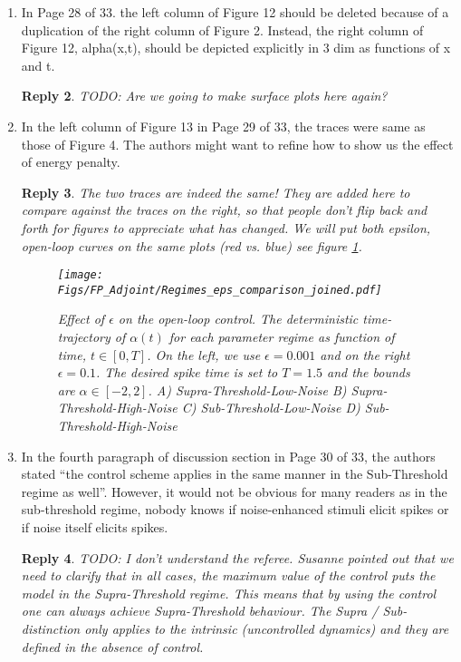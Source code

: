 \documentclass{article}
\newtheorem*{rep}{Reply}
\begin{document}
\begin{enumerate}
\begin{rep}
WE have added the following two sentences to the draft:
TODO:

\end{rep}
\item In Page 28 of 33. the left column of Figure 12 should be deleted because
of a duplication of the right column of Figure 2. Instead, the right column of Figure
12, alpha(x,t), should be depicted explicitly in 3 dim as functions of x and t.
\begin{rep}
TODO:
Are we going to make surface plots here again?
\end{rep}

\item In the left column of Figure 13 in Page 29 of 33, the traces were same as
those of Figure 4. The authors might want to refine how to show us the effect of
energy penalty.
\begin{rep}
The two traces are indeed the same! They are added here to compare against
the traces on the right, so that people don't flip back and forth for figures to
appreciate what has changed.
We will put both epsilon, open-loop curves on the same plots (red vs.
blue) see figure \ref{fig:epsilong_comparison_same_graph}.
\def \T {{ T}}
\begin{figure}[htp]
\begin{center}
  \texttt{[image: Figs/FP\_Adjoint/Regimes\_eps\_comparison\_joined.pdf]}
  \caption[labelInTOC]{Effect of $\epsilon$ on the open-loop control.
  The deterministic time-trajectory of $\alpha(t)$ for each
  parameter regime as function of time, $t \in [0, \T]$.
  On the left, we use $\epsilon = 0.001$ and on the right $\epsilon =0.1$.
  The desired spike time is set to $\T=1.5$ and the bounds are $\alpha \in
  [-2,2]$. A)
   Supra-Threshold-Low-Noise
    B) 
   Supra-Threshold-High-Noise
    C)
   Sub-Threshold-Low-Noise 
    D)
   Sub-Threshold-High-Noise}
  \label{fig:epsilong_comparison_same_graph}
\end{center}
\end{figure}

\end{rep}

\item In the fourth paragraph of discussion section in Page 30 of 33, the
authors stated “the control scheme applies in the same manner in the Sub-Threshold
regime as well”. However, it would not be obvious for many readers as in the
sub-threshold regime, nobody knows if noise-enhanced stimuli elicit spikes or if
noise itself elicits spikes.
\begin{rep}
TODO: I don't understand the referee. Susanne pointed out that we need to
clarify that in all cases, the maximum value of the control puts the model in
the Supra-Threshold regime. This means that by using the control one can
always achieve Supra-Threshold behaviour. The Supra / Sub- distinction only
applies to the intrinsic (uncontrolled dynamics) and they are defined in the
absence of control.


\end{rep}
\end{enumerate}
\end{document}
